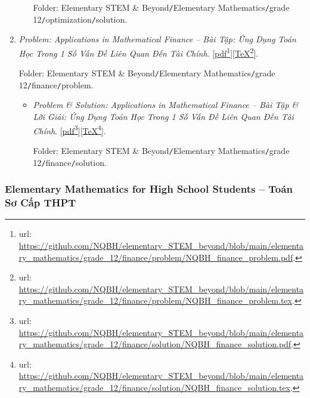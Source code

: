 \documentclass[12pt,oneside]{book}
\begin{document}
\begin{enumerate}
\begin{itemize}
		Folder: {\sf Elementary STEM \& Beyond{\tt/}Elementary Mathematics{\tt/}grade 12{\tt/}optimization{\tt/}solution}.
	\end{itemize}
	\item {\it Problem: Applications in Mathematical Finance -- Bài Tập: Ứng Dụng Toán Học Trong 1 Số Vấn Đề Liên Quan Đến Tài Chính}. [\href{https://github.com/NQBH/elementary_STEM_beyond/blob/main/elementary_mathematics/grade_12/finance/problem/NQBH_finance_problem.pdf}{pdf}\footnote{{\sc url}: \url{https://github.com/NQBH/elementary_STEM_beyond/blob/main/elementary_mathematics/grade_12/finance/problem/NQBH_finance_problem.pdf}.}][\href{https://github.com/NQBH/elementary_STEM_beyond/blob/main/elementary_mathematics/grade_12/finance/problem/NQBH_finance_problem.tex}{\TeX}\footnote{{\sc url}: \url{https://github.com/NQBH/elementary_STEM_beyond/blob/main/elementary_mathematics/grade_12/finance/problem/NQBH_finance_problem.tex}.}].
	
	Folder: {\sf Elementary STEM \& Beyond{\tt/}Elementary Mathematics{\tt/}grade 12{\tt/}finance{\tt/}problem}.
	\begin{itemize}
		\item {\it Problem \& Solution: Applications in Mathematical Finance -- Bài Tập \& Lời Giải: Ứng Dụng Toán Học Trong 1 Số Vấn Đề Liên Quan Đến Tài Chính}. [\href{https://github.com/NQBH/elementary_STEM_beyond/blob/main/elementary_mathematics/grade_12/finance/solution/NQBH_finance_solution.pdf}{pdf}\footnote{{\sc url}: \url{https://github.com/NQBH/elementary_STEM_beyond/blob/main/elementary_mathematics/grade_12/finance/solution/NQBH_finance_solution.pdf}.}][\href{https://github.com/NQBH/elementary_STEM_beyond/blob/main/elementary_mathematics/grade_12/finance/solution/NQBH_finance_solution.tex}{\TeX}\footnote{{\sc url}: \url{https://github.com/NQBH/elementary_STEM_beyond/blob/main/elementary_mathematics/grade_12/finance/solution/NQBH_finance_solution.tex}.}].
		
		Folder: {\sf Elementary STEM \& Beyond{\tt/}Elementary Mathematics{\tt/}grade 12{\tt/}finance{\tt/}solution}.
	\end{itemize}
\end{enumerate}

\subsubsection{Elementary Mathematics for High School Students -- Toán Sơ Cấp THPT}
\end{document}
